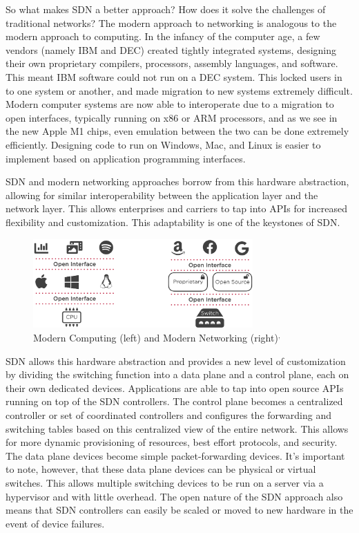 \documentclass[11pt]{article}
\begin{document}
So what makes SDN a better approach? How does it solve the challenges of traditional networks? The modern approach to networking is analogous to the modern approach to computing. In the infancy of the computer age, a few vendors (namely IBM and DEC) created tightly integrated systems, designing their own proprietary compilers, processors, assembly languages, and software. This meant IBM software could not run on a DEC system. This locked users in to one system or another, and made migration to new systems extremely difficult. Modern computer systems are now able to interoperate due to a migration to open interfaces, typically running on x86 or ARM processors,  and as we see in the new Apple M1 chips, even emulation between the two can be done extremely efficiently. Designing code to run on Windows, Mac, and Linux is easier to implement based on application programming interfaces.

SDN and modern networking approaches borrow from this hardware abstraction, allowing for similar interoperability between the application layer and the network layer. This allows enterprises and carriers to tap into APIs for increased flexibility and customization. This adaptability is one of the keystones of SDN.

\begin{figure}
	\centering
	\includegraphics[width=0.75\textwidth]{ModernComparison}
	\caption[]{Modern Computing (left) and Modern Networking (right)\footnotemark\(^,\)\footnotemark}
\end{figure}

SDN allows this hardware abstraction and provides a new level of customization by dividing the switching function into a data plane and a control plane, each on their own dedicated devices. Applications are able to tap into open source APIs running on top of the SDN controllers. The control plane becomes a centralized controller or set of coordinated controllers and configures the forwarding and switching tables based on this centralized view of the entire network. This allows for more dynamic provisioning of resources, best effort protocols, and security. The data plane devices become simple packet-forwarding devices. It’s important to note, however, that these data plane devices can be physical or virtual switches. This allows multiple switching devices to be run on a server via a hypervisor and with little overhead. The open nature of the SDN approach also means that SDN controllers can easily be scaled or moved to new hardware in the event of device failures.
\end{document}
